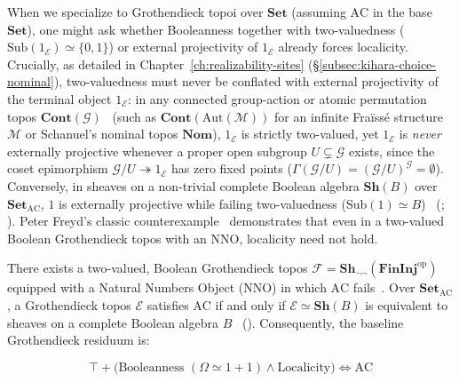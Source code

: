 When we specialize to Grothendieck topoi over $\mathbf{Set}$ (assuming $\mathrm{AC}$ in the base $\mathbf{Set}$), one might ask whether Booleanness together with two-valuedness ($\mathrm{Sub}(1_{\mathcal{E}}) \simeq \{0, 1\}$) or external projectivity of $1_{\mathcal{E}}$ already forces localicity. Crucially, as detailed in Chapter~\ref{ch:realizability-sites} (\S\ref{subsec:kihara-choice-nominal}), two-valuedness must never be conflated with external projectivity of the terminal object $1_{\mathcal{E}}$: in any connected group-action or atomic permutation topos $\mathbf{Cont}(\mathcal{G})$~\cite[Ch.~III, \S 9]{MacLaneMoerdijk92} (such as $\mathbf{Cont}(\mathrm{Aut}(\mathcal{M}))$ for an infinite Fra\"iss\'e structure $\mathcal{M}$ or Schanuel's nominal topos $\mathbf{Nom}$), $1_{\mathcal{E}}$ is strictly two-valued, yet $1_{\mathcal{E}}$ is \emph{never} externally projective whenever a proper open subgroup $U \subsetneq \mathcal{G}$ exists, since the coset epimorphism $\mathcal{G}/U \twoheadrightarrow 1_{\mathcal{E}}$ has zero fixed points ($\Gamma(\mathcal{G}/U) = (\mathcal{G}/U)^{\mathcal{G}} = \emptyset$). Conversely, in sheaves on a non-trivial complete Boolean algebra $\mathbf{Sh}(B)$ over $\mathbf{Set}_{\mathrm{AC}}$, $1$ is externally projective while failing two-valuedness ($\mathrm{Sub}(1) \simeq B$)~\cite{Barr74} (\cite[\S D4.5]{Johnstone02}; \cite[Chs.~VI, IX]{MacLaneMoerdijk92}). Peter Freyd's classic counterexample~\cite{Freyd72} demonstrates that even in a two-valued Boolean Grothendieck topos with an $\mathrm{NNO}$, localicity need not hold.

\begin{theorem}\label{thm:bdf}%
%

There exists a two-valued, Boolean Grothendieck topos $\mathcal{F} = \mathbf{Sh}_{\neg\neg}(\mathbf{FinInj}^{\mathrm{op}})$ equipped with a Natural Numbers Object ($\mathrm{NNO}$) in which $\mathrm{AC}$ fails~\cite{Freyd72}. Over $\mathbf{Set}_{\mathrm{AC}}$, a Grothendieck topos $\mathcal{E}$ satisfies $\mathrm{AC}$ if and only if $\mathcal{E} \simeq \mathbf{Sh}(B)$ is equivalent to sheaves on a complete Boolean algebra $B$~\cite{Barr74,Diaconescu75,Freyd72} (\cite[\S D4.5, Thms.~D4.5.3--D4.5.7]{Johnstone02}). Consequently, the baseline Grothendieck residuum is:

\[
  \top + \bigl(\text{Booleanness } (\Omega \simeq 1+1) \wedge \text{Localicity}\bigr) \iff \mathrm{AC}
\]

\end{theorem}

